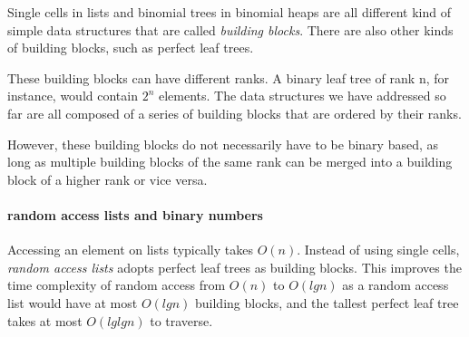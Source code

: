 \documentclass[\main/thesis.tex]{subfiles}
\begin{document}
Single cells in lists and binomial trees in binomial heaps are all different
kind of simple data structures that are called \textit{building blocks}.
There are also other kinds of building blocks, such as perfect leaf trees.

\begin{center}
\end{center}

These building blocks can have different ranks.
A binary leaf tree of rank n, for instance, would contain $ 2^n $ elements.
The data structures we have addressed so far are all composed of a series of
building blocks that are ordered by their ranks.

However, these building blocks do not necessarily have to be binary based,
as long as multiple building blocks of the same rank can be merged into a
building block of a higher rank or vice versa.


\paragraph{random access lists and binary numbers}

Accessing an element on lists typically takes $ O(n) $.
Instead of using single cells, \textit{random access lists} adopts perfect
leaf trees as building blocks.
This improves the time complexity of random access from $ O(n) $ to $ O(lg n) $
as a random access list would have at most $ O(lg n) $ building blocks, and
the tallest perfect leaf tree takes at most $ O(lglg n) $ to traverse.
\end{document}
